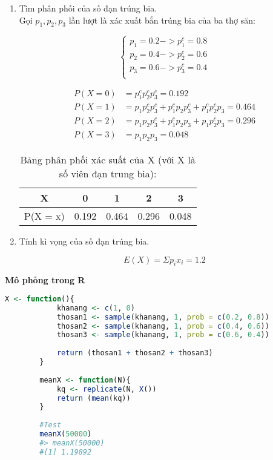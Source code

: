 \documentclass[a4paper,12pt]{article}
\begin{document}
	\begin{enumerate}[label = \alph*)]
		\item Tìm phân phối của số đạn trúng bia.\\
		
		Gọi $p_1, p_2, p_3$ lần lượt là xác xuất bắn trúng bia của ba thợ săn:
		
		\begin{equation*}
		\begin{cases}
		p_1 = 0.2 -> p_1^c = 0.8\\
		p_2 = 0.4 -> p_2^c = 0.6\\
		p_3 = 0.6 -> p_3^c = 0.4\\
		\end{cases}
		\end{equation*}
		
		\begin{align*}
		P(X = 0) &= p_1^c p_2^c p_3^c = 0.192\\
		P(X = 1) &= p_1 p_2^c p_3^c + p_1^c p_2 p_3^c + p_1^c p_2^c p_3 = 0.464\\
		P(X = 2) &= p_1 p_2 p_3^c + p_1^c p_2 p_3 + p_1 p_2^c p_3 = 0.296\\
		P(X = 3) &= p_1 p_2 p_3 = 0.048
		\end{align*}
		
		\begin{table}[h!]
			\begin{center}
				\caption{Bảng phân phối xác suất của X (với X là số viên đạn trung bia):}
				\begin{tabular}{|c|c|c|c|c|}
					\hline 
					X & 0 & 1 & 2 & 3 \\ 
					\hline 
					P(X = x) & 0.192 & 0.464 & 0.296 & 0.048 \\ 
					\hline 
				\end{tabular} 
			\end{center}
		\end{table}
		
		\item Tính kì vọng của số đạn trúng bia.
		
		\begin{equation*}
			E(X) = \Sigma p_ix_i = 1.2
		\end{equation*}
		
	\end{enumerate}
	
	{\large\textbf{Mô phỏng trong R}} \\
	\begin{lstlisting}[language=R]
		X <- function(){
			khanang <- c(1, 0)
			thosan1 <- sample(khanang, 1, prob = c(0.2, 0.8))
			thosan2 <- sample(khanang, 1, prob = c(0.4, 0.6))
			thosan3 <- sample(khanang, 1, prob = c(0.6, 0.4))
		
			return (thosan1 + thosan2 + thosan3)
		}
		
		meanX <- function(N){
			kq <- replicate(N, X())
			return (mean(kq))
		}
		
		#Test
		meanX(50000)
		#> meanX(50000)
		#[1] 1.19892	
	\end{lstlisting}
	
\end{document}
